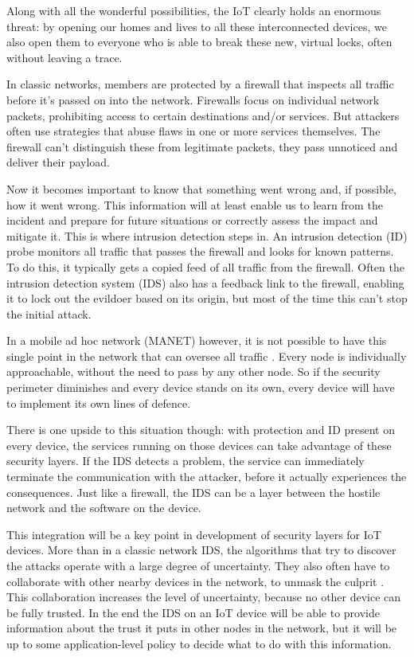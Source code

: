 \documentclass[conference]{IEEEtran}
\begin{document}
Along with all the wonderful possibilities, the IoT clearly holds an enormous
threat: by opening our homes and lives to all these interconnected devices, we
also open them to everyone who is able to break these new, virtual locks, often
without leaving a trace.

In classic networks, members are protected by a firewall that inspects all
traffic before it's passed on into the network. Firewalls focus on individual
network packets, prohibiting access to certain destinations and/or services.
But attackers often use strategies that abuse flaws in one or more services
themselves. The firewall can't distinguish these from legitimate packets, they
pass unnoticed and deliver their payload.

Now it becomes important to know that something went wrong and, if possible,
how it went wrong. This information will at least enable us to learn from the
incident and prepare for future situations or correctly assess the impact and
mitigate it. This is where intrusion detection steps in. An intrusion detection
(ID) probe monitors all traffic that passes the firewall and looks for known
patterns. To do this, it typically gets a copied feed of all traffic from the
firewall. Often the intrusion detection system (IDS) also has a feedback link
to the firewall, enabling it to lock out the evildoer based on its origin, but
most of the time this can't stop the initial attack.

In a mobile ad hoc network (MANET) however, it is not possible to have this
single point in the network that can oversee all traffic
\cite{mishra2004intrusion}. Every node is individually approachable, without
the need to pass by any other node. So if the security perimeter diminishes and
every device stands on its own, every device will have to implement its own
lines of defence.

There is one upside to this situation though: with protection and ID present on
every device, the services running on those devices can take advantage of these
security layers. If the IDS detects a problem, the service can immediately
terminate the communication with the attacker, before it actually experiences
the consequences. Just like a firewall, the IDS can be a layer between the
hostile network and the software on the device.

This integration will be a key point in development of security layers for IoT
devices. More than in a classic network IDS, the algorithms that try to
discover the attacks operate with a large degree of uncertainty. They also
often have to collaborate with other nearby devices in the network, to unmask
the culprit \cite{marchang2008collaborative,krontiris2009cooperative}. This
collaboration increases the level of uncertainty, because no other device can
be fully trusted. In the end the IDS on an IoT device will be able to provide
information about the trust \cite{ganeriwal2008reputation} it puts in other
nodes in the network, but it will be up to some application-level policy to
decide what to do with this information.
\end{document}
